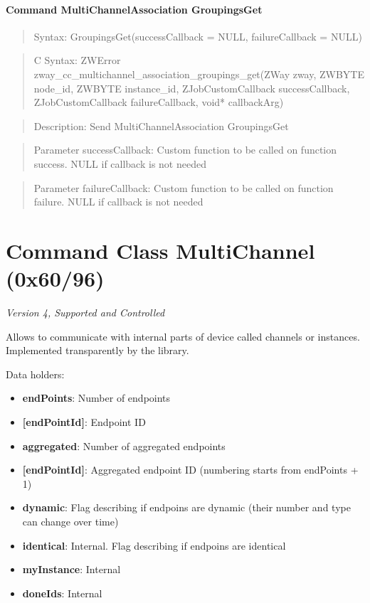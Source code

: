 \paragraph{Command MultiChannelAssociation GroupingsGet}
\begin{quote}Syntax: GroupingsGet(successCallback = NULL, failureCallback = NULL)\end{quote}
\begin{quote}C Syntax: ZWError zway\_cc\_multichannel\_association\_groupings\_get(ZWay zway, ZWBYTE node\_id, ZWBYTE instance\_id, ZJobCustomCallback successCallback, ZJobCustomCallback failureCallback, void* callbackArg)\end{quote}
\begin{quote}Description: Send MultiChannelAssociation GroupingsGet\end{quote}
\begin{quote}Parameter successCallback: Custom function to be called on function success. NULL if callback is not needed\end{quote}
\begin{quote}Parameter failureCallback: Custom function to be called on function failure. NULL if callback is not needed\end{quote}



\section{Command Class MultiChannel (0x60/96)}

\textit{Version 4, Supported and Controlled}
\newline

Allows to communicate with internal parts of device called channels or instances. Implemented transparently by the library.
\newline

\noindent
Data holders:

\begin{itemize}
\item \textbf{endPoints}: Number of endpoints
\item \qquad\textbf{[endPointId]}: Endpoint ID
\item \textbf{aggregated}: Number of aggregated endpoints
\item \qquad\textbf{[endPointId]}: Aggregated endpoint ID (numbering starts from endPoints + 1)
\item \textbf{dynamic}: Flag describing if endpoins are dynamic (their number and type can change over time)
\item \textbf{identical}: Internal. Flag describing if endpoins are  identical
\item \textbf{myInstance}: Internal
\item \textbf{doneIds}: Internal
\end{itemize}

